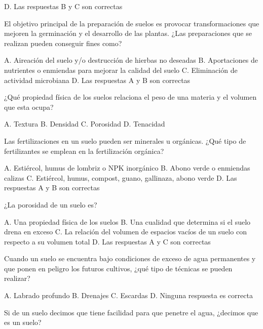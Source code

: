 \documentclass[11pt]{exam}
\begin{document}
{\begin{questions}
\begin{checkboxes}
    \CorrectChoice D. Las respuestas B y C son correctas
  \end{checkboxes}
\question El objetivo principal de la preparación de suelos es provocar transformaciones
  que mejoren la germinación y el desarrollo de las plantas. ¿Las preparaciones que se
  realizan pueden conseguir fines como?
  \begin{checkboxes}
    \choice A. Aireación del suelo y/o destrucción de hierbas no deseadas
    \choice B. Aportaciones de nutrientes o enmiendas para mejorar la calidad del suelo
    \choice C. Eliminación de actividad microbiana
    \CorrectChoice D. Las respuestas A y B son correctas
  \end{checkboxes} 
\question ¿Qué propiedad física de los suelos relaciona el peso de una materia y
  el volumen que esta ocupa?
  \begin{checkboxes}
    \choice A. Textura
    \CorrectChoice B. Densidad
    \choice C. Porosidad
    \choice D. Tenacidad
  \end{checkboxes}
\question Las fertilizaciones en un suelo pueden ser minerales u orgánicas. ¿Qué tipo
  de fertilizantes se emplean en la fertilización orgánica?
  \begin{checkboxes}
    \choice A. Estiércol, humus de lombriz o NPK inorgánico
    \choice B. Abono verde  o enmiendas calizas
    \CorrectChoice C. Estiércol, humus, compost, guano, gallinaza, abono verde
    \choice D. Las respuestas A y B son correctas
  \end{checkboxes}
\question ¿La porosidad de un suelo es?
  \begin{checkboxes}
    \choice A. Una propiedad física de los suelos
    \choice B. Una cualidad que determina si el suelo drena en exceso
    \choice C. La relación del volumen de espacios vacíos de un suelo con
    respecto a su volumen total
    \CorrectChoice D. Las respuestas A y C son correctas
  \end{checkboxes}
\question Cuando un suelo se encuentra bajo condiciones de exceso de agua
  permanentes y que ponen en peligro los futuros cultivos, ¿qué tipo de
  técnicas se pueden realizar?
  \begin{checkboxes}
    \choice A. Labrado profundo
    \CorrectChoice B. Drenajes
    \choice C. Escardas
    \choice D. Ninguna respuesta es correcta
  \end{checkboxes}
  \newpage
\question Si de un suelo decimos que tiene facilidad para que penetre el agua,
  ¿decimos que es un suelo?
  \begin{checkboxes}

\end{checkboxes}
\end{questions}}
\end{document}
